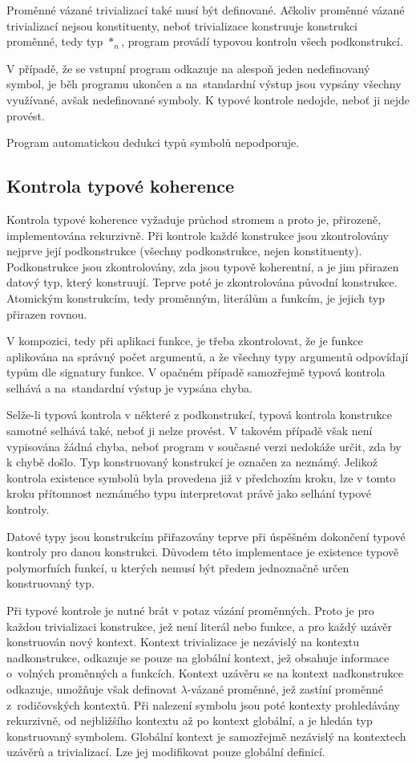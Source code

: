 \documentclass{article}
\begin{document}
Proměnné vázané trivializací také musí být definované. Ačkoliv proměnné vázané trivializací nejsou
konstituenty, neboť trivializace konstruuje konstrukci proměnné, tedy typ $*_{n}$, program provádí typovou
kontrolu všech podkonstrukcí.

V případě, že se vstupní program odkazuje na alespoň jeden nedefinovaný symbol, je běh programu ukončen a
na~standardní výstup jsou vypsány všechny využívané, avšak nedefinované symboly. K typové kontrole nedojde,
neboť ji nejde provést.

Program automatickou dedukci typů symbolů nepodporuje.

\subsection{Kontrola typové koherence}

Kontrola typové koherence vyžaduje průchod stromem a proto je, přirozeně, implementována rekurzivně. Při
kontrole každé konstrukce jsou zkontrolovány nejprve její podkonstrukce (všechny podkonstrukce, nejen
konstituenty). Podkonstrukce jsou zkontrolovány, zda jsou typově koherentní, a je jim přirazen datový
typ, který konstruují. Teprve poté je zkontrolována původní konstrukce. Atomickým konstrukcím, tedy
proměnným, literálům a funkcím, je jejich typ přirazen rovnou.

V kompozici, tedy při aplikaci funkce, je třeba zkontrolovat, že je funkce aplikována na správný počet
argumentů, a že všechny typy argumentů odpovídají typům dle signatury funkce. V opačném případě
samozřejmě typová kontrola selhává a na~standardní výstup je vypsána chyba.

Selže-li typová kontrola v některé z podkonstrukcí, typová kontrola konstrukce samotné selhává také,
neboť ji nelze provést. V takovém případě však není vypisována žádná chyba, neboť program v současné
verzi nedokáže určit, zda by k chybě došlo. Typ konstruovaný konstrukcí je označen za neznámý. Jelikož
kontrola existence symbolů byla provedena již v předchozím kroku, lze v tomto kroku přítomnost neznámého
typu interpretovat právě jako selhání typové kontroly.

Datové typy jsou konstrukcím přiřazovány teprve při úspěšném dokončení typové kontroly pro danou konstrukci.
Důvodem této implementace je existence typově polymorfních funkcí, u kterých nemusí být předem jednoznačně
určen konstruovaný typ.

Při typové kontrole je nutné brát v potaz vázání proměnných. Proto je pro každou trivializaci konstrukce, jež
není literál nebo funkce, a pro každý uzávěr konstruován nový kontext. Kontext trivializace je nezávislý na
kontextu nadkonstrukce, odkazuje se pouze na globální kontext, jež obsahuje informace o~volných proměnných
a funkcích. Kontext uzávěru se na kontext nadkonstrukce odkazuje, umožňuje však definovat $\lambda$-vázané proměnné,
jež zastíní proměnné z~rodičovských kontextů. Při nalezení symbolu jsou poté kontexty prohledávány rekurzivně,
od nejbližšího kontextu až po kontext globální, a je hledán typ konstruovaný symbolem. Globální kontext je
samozřejmě nezávislý na kontextech uzávěrů a trivializací. Lze jej modifikovat pouze globální definicí.
\end{document}

